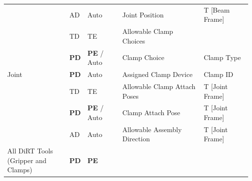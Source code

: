 \documentclass[11pt]{book}
\begin{document}
\begin{table}[H]
\begin{adjustbox}{max width=\textwidth}
\begin{tabular}{p{2.09cm}p{1.51cm}p{1.93cm}p{5.92cm}p{4.48cm}}
\hline
\multicolumn{1}{|p{2.09cm}}{\multirow{7}{*}{\parbox{2.09cm}{{\footnotesize Joint}}}} & 
\multicolumn{1}{|p{1.51cm}}{{\footnotesize AD}} & 
\multicolumn{1}{|p{1.93cm}}{{\footnotesize Auto}} & 
\multicolumn{1}{|p{5.92cm}}{{\footnotesize Joint Position}} & 
\multicolumn{1}{|p{4.48cm}|}{{\footnotesize T [Beam Frame]}} \\ 
\hhline{~----}
\multicolumn{1}{|p{2.09cm}}{} & 
\multicolumn{1}{|p{1.51cm}}{{\footnotesize TD}} & 
\multicolumn{1}{|p{1.93cm}}{{\footnotesize TE}} & 
\multicolumn{1}{|p{5.92cm}}{{\footnotesize Allowable Clamp Choices}} & 
\multicolumn{1}{|p{4.48cm}|}{} \\ 
\hhline{~----}
\multicolumn{1}{|p{2.09cm}}{} & 
\multicolumn{1}{|p{1.51cm}}{{\footnotesize \textbf{PD}}} & 
\multicolumn{1}{|p{1.93cm}}{{\footnotesize \textbf{PE }/ Auto}} & 
\multicolumn{1}{|p{5.92cm}}{{\footnotesize Clamp Choice}} & 
\multicolumn{1}{|p{4.48cm}|}{{\footnotesize Clamp Type}} \\ 
\hhline{~----}
\multicolumn{1}{|p{2.09cm}}{} & 
\multicolumn{1}{|p{1.51cm}}{{\footnotesize \textbf{PD}}} & 
\multicolumn{1}{|p{1.93cm}}{{\footnotesize Auto}} & 
\multicolumn{1}{|p{5.92cm}}{{\footnotesize Assigned Clamp Device}} & 
\multicolumn{1}{|p{4.48cm}|}{{\footnotesize Clamp ID}} \\ 
\hhline{~----}
\multicolumn{1}{|p{2.09cm}}{} & 
\multicolumn{1}{|p{1.51cm}}{{\footnotesize TD}} & 
\multicolumn{1}{|p{1.93cm}}{{\footnotesize TE}} & 
\multicolumn{1}{|p{5.92cm}}{{\footnotesize Allowable Clamp Attach Poses}} & 
\multicolumn{1}{|p{4.48cm}|}{{\footnotesize T [Joint Frame]}} \\ 
\hhline{~----}
\multicolumn{1}{|p{2.09cm}}{} & 
\multicolumn{1}{|p{1.51cm}}{{\footnotesize \textbf{PD}}} & 
\multicolumn{1}{|p{1.93cm}}{{\footnotesize \textbf{PE }/ Auto}} & 
\multicolumn{1}{|p{5.92cm}}{{\footnotesize Clamp Attach Pose}} & 
\multicolumn{1}{|p{4.48cm}|}{{\footnotesize T [Joint Frame]}} \\ 
\hhline{~----}
\multicolumn{1}{|p{2.09cm}}{} & 
\multicolumn{1}{|p{1.51cm}}{{\footnotesize AD}} & 
\multicolumn{1}{|p{1.93cm}}{{\footnotesize Auto}} & 
\multicolumn{1}{|p{5.92cm}}{{\footnotesize Allowable Assembly Direction}} & 
\multicolumn{1}{|p{4.48cm}|}{{\footnotesize T [Joint Frame]}} \\ 
\hline
\multicolumn{1}{|p{2.09cm}}{\multirow{3}{*}{\parbox{2.09cm}{{\footnotesize All DiRT Tools \\ (Gripper and Clamps)}}}} & 
\multicolumn{1}{|p{1.51cm}}{{\footnotesize \textbf{PD}}} & 
\multicolumn{1}{|p{1.93cm}}{{\footnotesize \textbf{PE}}} & 

\end{tabular}
\end{adjustbox}
\end{table}
\end{document}
